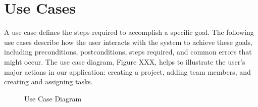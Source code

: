 \section{Use Cases}
A use case defines the steps required to accomplish a specific goal. The following use cases describe how the user interacts with the system to achieve these goals, including preconditions, postconditions, steps required, and common errors that might occur. The use case diagram, Figure XXX, helps to illustrate the user’s major actions in our application: creating a project, adding team members, and creating and assigning tasks. 
\begin{figure}[ht]
\centering
{}
\caption{Use Case Diagram}
\end{figure}

\begin{figure}[ht]
\begin{usecase}







\end{usecase}
\end{figure}
